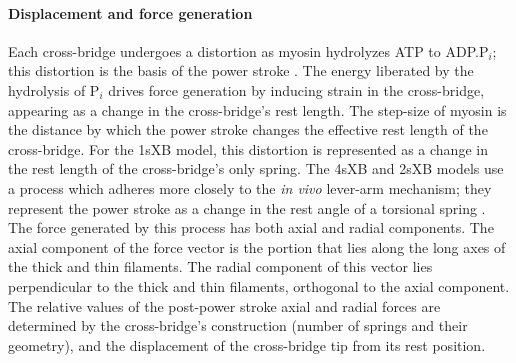 \documentclass[]{article}
\begin{document}
\paragraph{Displacement and force generation} %
Each cross-bridge undergoes a distortion as myosin hydrolyzes ATP to ADP.P$_i$; this distortion is the basis of the power stroke \citep{Pate1989, Daniel1998, Tanner2007}. 
The energy liberated by the hydrolysis of P$_i$ drives force generation by inducing strain in the cross-bridge, appearing as a change in the cross-bridge's rest length.  
The step-size of myosin is the distance by which the power stroke changes the effective rest length of the cross-bridge.  
For the 1sXB model, this distortion is represented as a change in the rest length of the cross-bridge's only spring. 
The 4sXB and 2sXB models use a process which adheres more closely to the \emph{in vivo} lever-arm mechanism; they represent the power stroke as a change in the rest angle of a torsional spring \citep{Reedy2000}.
The force generated by this process has both axial and radial components. 
The axial component of the force vector is the portion that lies along the long axes of the thick and thin filaments. 
The radial component of this vector lies perpendicular to the thick and thin filaments, orthogonal to the axial component. 
The relative values of the post-power stroke axial and radial forces are determined by the cross-bridge's construction (number of springs and their geometry), and the displacement of the cross-bridge tip from its rest position. 
\end{document}
